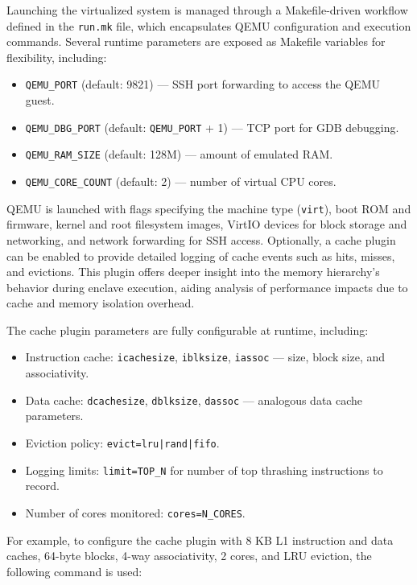 Launching the virtualized system is managed through a Makefile-driven workflow defined in the \texttt{run.mk} file, which encapsulates QEMU configuration and execution commands. Several runtime parameters are exposed as Makefile variables for flexibility, including:

\begin{itemize}
    \item \texttt{QEMU\_PORT} (default: 9821) — SSH port forwarding to access the QEMU guest.  
    \item \texttt{QEMU\_DBG\_PORT} (default: \texttt{QEMU\_PORT} + 1) — TCP port for GDB debugging.  
    \item \texttt{QEMU\_RAM\_SIZE} (default: 128M) — amount of emulated RAM.  
    \item \texttt{QEMU\_CORE\_COUNT} (default: 2) — number of virtual CPU cores.
\end{itemize}

QEMU is launched with flags specifying the machine type (\texttt{virt}), boot ROM and firmware, kernel and root filesystem images, VirtIO devices for block storage and networking, and network forwarding for SSH access. Optionally, a cache plugin \cite{mandour2021cache} can be enabled to provide detailed logging of cache events such as hits, misses, and evictions. This plugin offers deeper insight into the memory hierarchy’s behavior during enclave execution, aiding analysis of performance impacts due to cache and memory isolation overhead.

The cache plugin \cite{mandour2021cache} parameters are fully configurable at runtime, including:

\begin{itemize}
    \item Instruction cache: \texttt{icachesize}, \texttt{iblksize}, \texttt{iassoc} — size, block size, and associativity.  
    \item Data cache: \texttt{dcachesize}, \texttt{dblksize}, \texttt{dassoc} — analogous data cache parameters.  
    \item Eviction policy: \texttt{evict=lru|rand|fifo}.  
    \item Logging limits: \texttt{limit=TOP\_N} for number of top thrashing instructions to record.  
    \item Number of cores monitored: \texttt{cores=N\_CORES}.
\end{itemize}

For example, to configure the cache plugin with 8 KB L1 instruction and data caches, 64-byte blocks, 4-way associativity, 2 cores, and LRU eviction, the following command is used:

